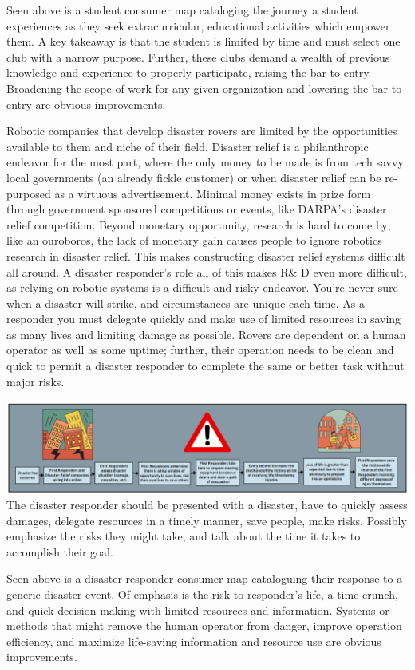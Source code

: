 \documentclass[a4paper, 10pt]{article}
\begin{document}
		Seen above is a student consumer map cataloging the journey a student experiences as they seek extracurricular, educational activities which empower them. A key takeaway is that the student is limited by time and must select one club with a narrow purpose. Further, these clubs demand a wealth of previous knowledge and experience to properly participate, raising the bar to entry. Broadening the scope of work for any given organization and lowering the bar to entry are obvious improvements.
		
		Robotic companies that develop disaster rovers are limited by the opportunities available to them and niche of their field. Disaster relief is a philanthropic endeavor for the most part, where the only money to  be made is from tech savvy local governments (an already fickle customer) or when disaster relief can be re-purposed as a virtuous advertisement. Minimal money exists in prize form through government sponsored competitions or events, like DARPA's disaster relief competition. Beyond monetary opportunity, research is hard to come by; like an ouroboros, the lack of monetary gain causes people to ignore robotics research in disaster relief. This makes constructing disaster relief systems difficult all around. A disaster responder's role all of this makes R\& D even more difficult, as relying on robotic systems is a difficult and risky endeavor. You're never sure when a disaster will strike, and circumstances are unique each time. As a responder you must delegate quickly and make use of limited resources in saving as many lives and limiting damage as possible. Rovers are dependent on a human operator as well as some uptime; further, their operation needs to be clean and quick to permit a disaster responder to complete the same or better task without major risks.
		
\includegraphics[scale=0.5]{Disaster Consumer Map}		
		The disaster responder should be presented with a disaster, have to quickly assess damages, delegate  resources in a timely manner, save people, make risks. Possibly emphasize the risks they might take, and talk about the time it takes to accomplish their goal. 
		
		Seen above is a disaster responder consumer map cataloguing their response to a generic disaster event. Of emphasis is the risk to responder's life, a time crunch, and quick decision making with limited resources and information. Systems or methods that might remove the human operator from danger, improve operation efficiency, and maximize life-saving information and resource use are obvious improvements.
		
\end{document}
